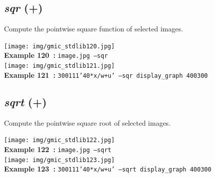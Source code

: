\documentclass[a4paper,10.5pt,twoside]{book}
\def\comma{\discretionary{,}{}{,}}
\begin{document}
\subsection{\emph{sqr} (+)}\vspace*{-0.7em}
Compute the pointwise square function of selected images.
\begin{center}\texttt{[image: img/gmic\_stdlib120.jpg]}\\
{\footnotesize \textbf{Example 120~:} \texttt{image.jpg --sqr}}
\\\texttt{[image: img/gmic\_stdlib121.jpg]}\\
{\footnotesize \textbf{Example 121~:} \texttt{300{\comma}1{\comma}1{\comma}1{\comma}'40*x/w+u' --sqr display\_graph 400{\comma}300}}
\end{center}

\subsection{\emph{sqrt} (+)}\vspace*{-0.7em}
Compute the pointwise square root of selected images.
\begin{center}\texttt{[image: img/gmic\_stdlib122.jpg]}\\
{\footnotesize \textbf{Example 122~:} \texttt{image.jpg --sqrt}}
\\\texttt{[image: img/gmic\_stdlib123.jpg]}\\
{\footnotesize \textbf{Example 123~:} \texttt{300{\comma}1{\comma}1{\comma}1{\comma}'40*x/w+u' --sqrt display\_graph 400{\comma}300}}
\end{center}
\end{document}
